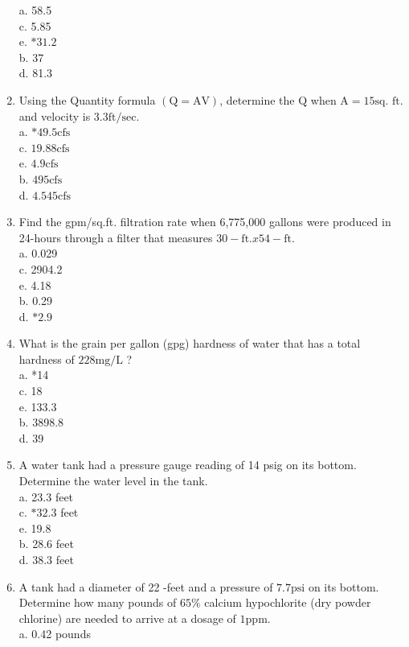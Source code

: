 \begin{enumerate}
a. 58.5\\
c. 5.85\\
e. $* 31.2$\\
b. 37\\
d. 81.3\\
\item Using the Quantity formula $(\mathrm{Q}=\mathrm{AV})$, determine the $\mathrm{Q}$ when $\mathrm{A}=15 \mathrm{sq}$. $\mathrm{ft}$. and velocity is $3.3 \mathrm{ft} / \mathrm{sec}$.\\
a. $* 49.5 \mathrm{cfs}$\\
c. $19.88 \mathrm{cfs}$\\
e. $4.9 \mathrm{cfs}$\\
b. $495 \mathrm{cfs}$\\
d. $4.545 \mathrm{cfs}$\\
\item Find the gpm/sq.ft. filtration rate when 6,775,000 gallons were produced in 24-hours through a filter that measures $30-\mathrm{ft} . x 54-\mathrm{ft}$.\\
a. 0.029\\
c. 2904.2\\
e. 4.18\\
b. 0.29\\
d. $* 2.9$\\
\item What is the grain per gallon (gpg) hardness of water that has a total hardness of $228 \mathrm{mg} / \mathrm{L}$ ?\\
a. *14\\
c. 18\\
e. 133.3\\
b. 3898.8\\
d. 39\\
\item A water tank had a pressure gauge reading of 14 psig on its bottom. Determine the water level in the tank.\\
a. 23.3 feet\\
c. $* 32.3$ feet\\
e. 19.8\\
b. 28.6 feet\\
d. 38.3 feet\\
\item A tank had a diameter of 22 -feet and a pressure of $7.7 \mathrm{psi}$ on its bottom. Determine how many pounds of $65 \%$ calcium hypochlorite (dry powder chlorine) are needed to arrive at a dosage of $1 \mathrm{ppm}$.\\
a. 0.42 pounds\\

\end{enumerate}
